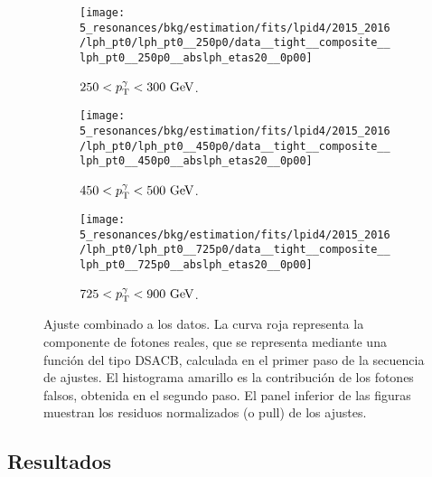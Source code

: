 \begin{enumerate}
        \begin{figure}[bth!]
            \centering
            \begin{subfigure}[h]{0.32\linewidth}
                \centering
                \texttt{[image: 5\_resonances/bkg/estimation/fits/lpid4/2015\_2016/lph\_pt0/lph\_pt0\_\_250p0/data\_\_tight\_\_composite\_\_lph\_pt0\_\_250p0\_\_abslph\_etas20\_\_0p00]}
                \caption{\(250 < p_{\text{T}}^{\gamma} < 300~\text{GeV}\).}
            \end{subfigure}
            \begin{subfigure}[h]{0.32\linewidth}
                \centering
                \texttt{[image: 5\_resonances/bkg/estimation/fits/lpid4/2015\_2016/lph\_pt0/lph\_pt0\_\_450p0/data\_\_tight\_\_composite\_\_lph\_pt0\_\_450p0\_\_abslph\_etas20\_\_0p00]}
                \caption{\(450 < p_{\text{T}}^{\gamma} < 500~\text{GeV}\).}
            \end{subfigure}
            \begin{subfigure}[h]{0.32\linewidth}
                \centering
                \texttt{[image: 5\_resonances/bkg/estimation/fits/lpid4/2015\_2016/lph\_pt0/lph\_pt0\_\_725p0/data\_\_tight\_\_composite\_\_lph\_pt0\_\_725p0\_\_abslph\_etas20\_\_0p00]}
                \caption{\(725 < p_{\text{T}}^{\gamma} < 900~\text{GeV}\).}
            \end{subfigure}
            \caption{Ajuste combinado a los datos. La curva roja representa la componente de fotones reales, que se representa mediante una función del tipo \ac{DSACB}, calculada en el primer paso de la secuencia de ajustes. El histograma amarillo es la contribución de los fotones falsos, obtenida en el segundo paso. El panel inferior de las figuras muestran los residuos normalizados (o pull) de los ajustes.}
            \label{fig:bkg:estimation:fits_tightID_data}
        \end{figure}
\end{enumerate}





\subsection{Resultados}
\label{subsec:bkg:estimation:results}

